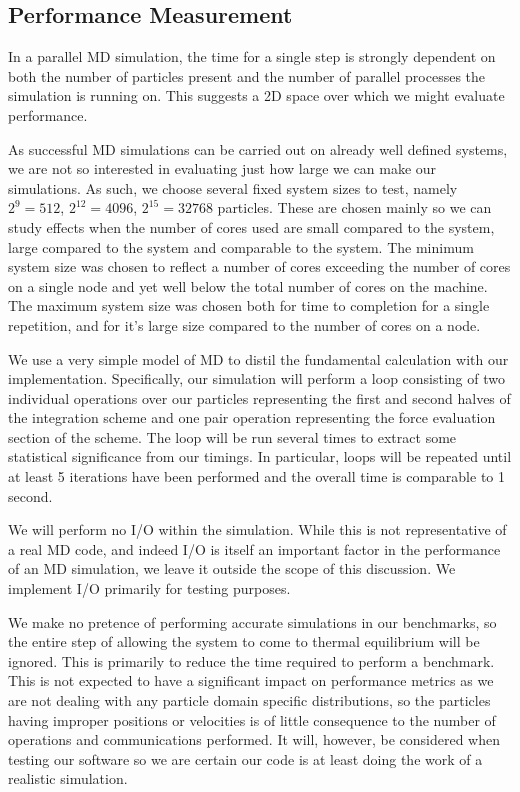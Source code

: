 \subsection{Performance Measurement}

%
In a parallel MD simulation, the time for a single step is strongly dependent
on both the number of particles present and
the number of parallel processes the simulation is running on.
%
This suggests a 2D space over which we might evaluate performance.

%
As successful MD simulations can be carried out on already well defined
systems, we are not so interested in evaluating just how large we can
make our simulations.
%
As such, we choose several fixed system sizes to test, namely
$2^{9} = 512$, $2^{12} = 4096$, $2^{15} = 32768$ particles.
%
These are chosen mainly so we can study effects when the number of cores
used are small compared to the system, large compared to the system
and comparable to the system.
%
The minimum system size was chosen to reflect a number of cores
exceeding the number of cores on a single \hector{} node and yet well
below the total number of cores on the machine.
%
The maximum system size was chosen both for time to completion for
a single repetition, and for it's large size compared to the number of
cores on a \hector{} node.

%
We use a very simple model of MD to distil the fundamental calculation
with our implementation.
%
Specifically, our simulation will perform a loop consisting of two
individual operations over our particles representing the first
and second halves of the \velocityverlet{} integration scheme and one
pair operation representing the force evaluation section of the scheme.
%
The loop will be run several times to extract some statistical significance
from our timings.
%
In particular, loops will be repeated until at least 5 iterations
have been performed and the overall time is comparable to 1 second.

%
We will perform no I/O within the simulation.
%
While this is not representative of a real MD code, and indeed I/O
is itself an important factor in the performance of an MD simulation,
we leave it outside the scope of this discussion.
%
We implement I/O primarily for testing purposes.

%
We make no pretence of performing accurate simulations in our benchmarks,
so the entire step of allowing the system to come to
thermal equilibrium will be ignored.
%
This is primarily to reduce the time required to perform a benchmark.
%
This is not expected to have a significant impact on performance metrics
as we are not dealing with any particle domain specific distributions,
so the particles having improper positions or velocities is of
little consequence to the number of operations and communications
performed.
%
It will, however, be considered when testing our software so we are
certain our code is at least doing the work of a realistic simulation.

